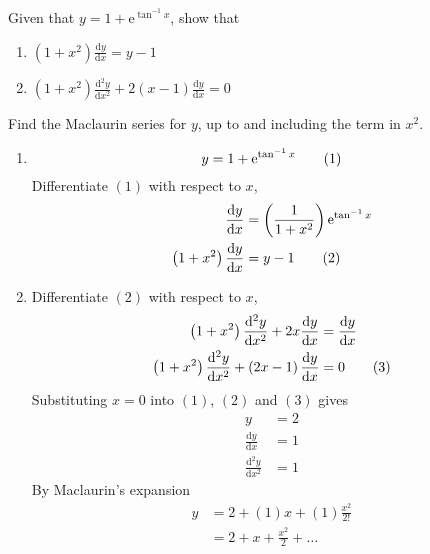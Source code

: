 \documentclass[11pt,a4paper]{book}
\begin{document}
\begin{example}

Given that $y=1+\mathrm{e}^{\tan^{-1}x}$, show that

\begin{enumerate}[label=(\alph*)]
\item ${\displaystyle \left(1+x^{2}\right)\frac{\mathrm{d}y}{\mathrm{d}x}=y-1}$
\item ${\displaystyle \left(1+x^{2}\right)\frac{\mathrm{d}^{2}y}{\mathrm{d}x^{2}}+2\left(x-1\right)\frac{\mathrm{d}y}{\mathrm{d}x}=0}$
\end{enumerate}

Find the Maclaurin series for $y$, up to and including the term in
$x^{2}$.

\Solution

\begin{enumerate}[label=(\alph*)]

\item

\begin{equation}
y=1+\mathrm{e}^{\tan^{-1}x}\tag{{1}}
\end{equation}
Differentiate $\left(1\right)$ with respect to $x$,
\begin{align}
\frac{\mathrm{d}y}{\mathrm{d}x} & =\left(\frac{1}{1+x^{2}}\right)\mathrm{e}^{\tan^{-1}x}\nonumber \\
\left(1+x^{2}\right)\frac{\mathrm{d}y}{\mathrm{d}x} & =y-1\tag{{2}}
\end{align}

\item Differentiate $\left(2\right)$ with respect to $x$,
\begin{align}
\left(1+x^{2}\right)\frac{\mathrm{d}^{2}y}{\mathrm{d}x^{2}}+2x\frac{\mathrm{d}y}{\mathrm{d}x} & =\frac{\mathrm{d}y}{\mathrm{d}x}\nonumber \\
\left(1+x^{2}\right)\frac{\mathrm{d}^{2}y}{\mathrm{d}x^{2}}+\left(2x-1\right)\frac{\mathrm{d}y}{\mathrm{d}x} & =0\tag{{3}}
\end{align}
Substituting $x=0$ into $\left(1\right)$, $\left(2\right)$ and
$\left(3\right)$ gives
\begin{align*}
y & =2\\
\frac{\mathrm{d}y}{\mathrm{d}x} & =1\\
\frac{\mathrm{d}^{2}y}{\mathrm{d}x^{2}} & =1
\end{align*}
By Maclaurin's expansion
\begin{align*}
y & =2+\left(1\right)x+\left(1\right)\frac{x^{2}}{2!}\\
 & =2+x+\frac{x^{2}}{2}+\ldots
\end{align*}

\end{enumerate}

\end{example}
\end{document}
